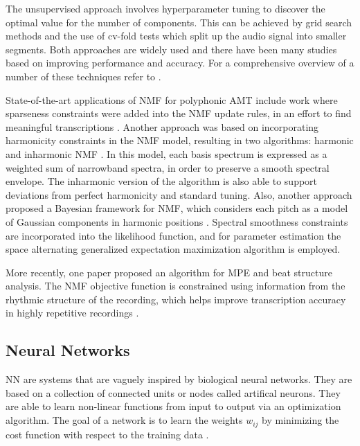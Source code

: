 The unsupervised approach involves hyperparameter tuning to discover the optimal
value for the number of components. This can be achieved by grid search methods
and the use of cv-fold tests which split up the audio signal into smaller segments.
Both approaches are widely used and there have been many studies based on improving performance and
accuracy. For a comprehensive overview of a number of these techniques refer to
\cite{f0estimation2006:Cheveigne,Christensen:2009, spmmt:Klapuri}.

State-of-the-art applications of \ac{NMF} for polyphonic \ac{AMT} include work where
sparseness constraints were added into the \ac{NMF} update rules, in an effort to
find meaningful transcriptions \cite{NMF-sparsity:2006}. Another approach was
based on incorporating harmonicity constraints in the \ac{NMF} model, resulting in
two algorithms: harmonic and inharmonic \ac{NMF} \cite{inharm-harm-NMF:Vincent2010}.
In this model, each basis spectrum is expressed as a
weighted sum of narrowband spectra, in order to preserve a smooth spectral
envelope. The inharmonic version of the algorithm is also able to support
deviations from perfect harmonicity and standard tuning. Also, another approach
proposed a Bayesian framework for \ac{NMF}, which considers each pitch as a model of
Gaussian components in harmonic positions \cite{bayesian-NMF:Bertin2007}.
Spectral smoothness constraints are incorporated into the likelihood function,
and for parameter estimation the space alternating generalized expectation maximization algorithm
is employed.

More recently, one paper proposed an algorithm for \ac{MPE} and
beat structure analysis. The \ac{NMF} objective function is constrained using
information from the rhythmic structure of the recording, which helps improve
transcription accuracy in highly repetitive recordings \cite{beat-NMF:Ochiai2012}.


\subsection{Neural Networks}

\ac{NN} are systems that are vaguely inspired by biological neural
networks. They are based on a collection of connected units or nodes called
artifical neurons. They are able to learn non-linear functions from input to
output via an optimization algorithm. The goal of a network is to learn the
weights $w_{ij}$ by minimizing the cost function with respect to the training
data \cite{DeepLearning2016}.

